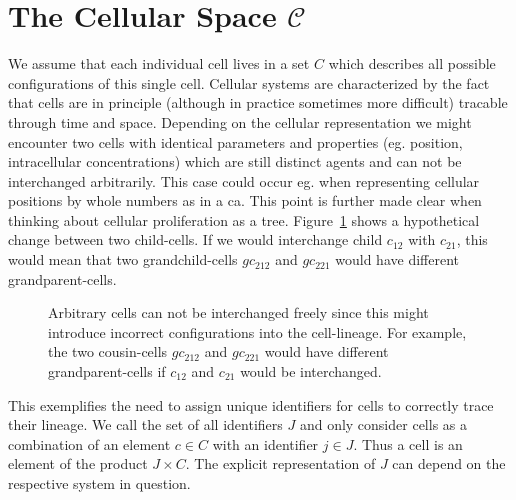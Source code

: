 \documentclass{article}
\begin{document}
\section{The Cellular Space $\mathscr{C}$}
We assume that each individual cell lives in a set $C$ which describes all possible configurations
of this single cell.
Cellular systems are characterized by the fact that cells are in principle (although in
practice sometimes more difficult) tracable through time and space.
Depending on the cellular representation we might encounter two cells with identical parameters and
properties (eg. position, intracellular concentrations) which are still distinct agents and can not
be interchanged arbitrarily.
This case could occur eg. when representing cellular positions by whole numbers as in a
\ac{ca}.
This point is further made clear when thinking about cellular proliferation as a tree.
Figure~\ref{fig:cell-lineage-break} shows a hypothetical change between two child-cells.
If we would interchange child $c_{12}$ with $c_{21}$, this would mean that two grandchild-cells
$gc_{212}$ and $gc_{221}$ would have different grandparent-cells.

\begin{figure}
    \centering
    \caption{
        Arbitrary cells can not be interchanged freely since this might introduce incorrect
        configurations into the cell-lineage.
        For example, the two cousin-cells $gc_{212}$ and $gc_{221}$ would have different
        grandparent-cells if $c_{12}$ and $c_{21}$ would be interchanged.
    }
    \label{fig:cell-lineage-break}
\end{figure}

This exemplifies the need to assign unique identifiers for cells to correctly trace their lineage.
We call the set of all identifiers $J$ and only consider cells as a combination of an element
$c\in C$ with an identifier $j\in J$.
Thus a cell is an element of the product $J\times C$.
The explicit representation of $J$ can depend on the respective system in question.
\end{document}
